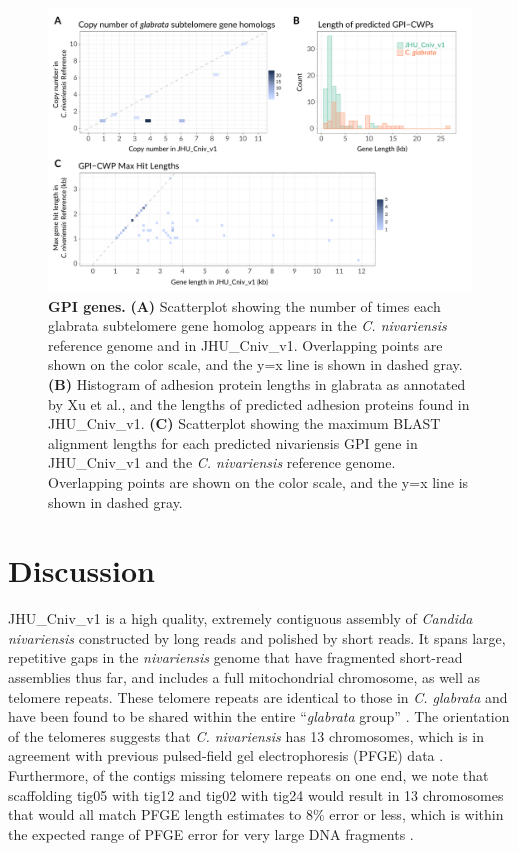 \begin{figure}[!hb]
\centering
\includegraphics[width = 1\linewidth,keepaspectratio]{figure/gpicwps.pdf}
\caption[GPI genes]{{\bf GPI genes.} {\bf (A)} Scatterplot showing the number of times each glabrata subtelomere gene homolog appears in the \textit{C. nivariensis} reference genome and in JHU\_Cniv\_v1. Overlapping points are shown on the color scale, and the y=x line is shown in dashed gray. {\bf (B)} Histogram of adhesion protein lengths in glabrata as annotated by Xu et al., and the lengths of predicted adhesion proteins found in JHU\_Cniv\_v1. {\bf (C)} Scatterplot showing the maximum BLAST alignment lengths for each predicted nivariensis GPI gene in JHU\_Cniv\_v1 and the \textit{C. nivariensis} reference genome. Overlapping points are shown on the color scale, and the y=x line is shown in dashed gray. }
\label{fig:gpicwps}
\end{figure}


\section{Discussion}
\label{sec:discuss}

JHU\_Cniv\_v1 is a high quality, extremely contiguous assembly of \textit{Candida nivariensis} constructed by long reads and polished by short reads. It spans large, repetitive gaps in the \textit{nivariensis} genome that have fragmented short-read assemblies thus far, and includes a full mitochondrial chromosome, as well as telomere repeats. These telomere repeats are identical to those in \textit{C. glabrata} and have been found to be shared within the entire “\textit{glabrata} group” \citep{Gabaldon2013-bk}. The orientation of the telomeres suggests that \textit{C. nivariensis} has 13 chromosomes, which is in agreement with previous pulsed-field gel electrophoresis (PFGE) data \citep{Gabaldon2013-bk}. Furthermore, of the contigs missing telomere repeats on one end, we note that scaffolding tig05 with tig12 and tig02 with tig24 would result in 13 chromosomes that would all match PFGE length estimates to 8\% error or less, which is within the expected range of PFGE error for very large DNA fragments \citep{Cutting1988-mw}.

